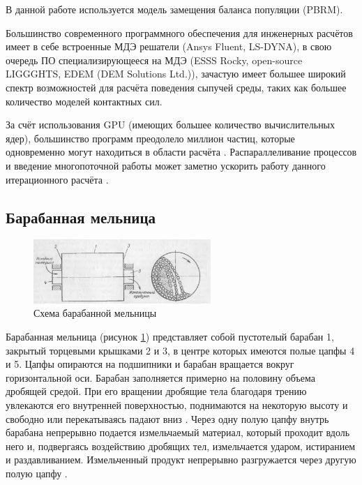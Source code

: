 \documentclass[utf8x, 14pt, oneside, a4paper]{article}
\begin{document}
В данной работе используется модель замещения баланса популяции (PBRM).

Большинство современного программного обеспечения для инженерных расчётов имеет в себе встроенные МДЭ решатели (Ansys Fluent, LS-DYNA), в свою очередь ПО специализирующееся на МДЭ (ESSS Rocky, open-source LIGGGHTS, EDEM (DEM Solutions Ltd.)), зачастую имеет большее широкий спектр возможностей для расчёта поведения сыпучей среды, таких как большее количество моделей контактных сил.

За счёт использования GPU (имеющих большее количество вычислительных ядер), большинство программ преодолело миллион частиц, которые одновременно могут находиться в области расчёта \cite{another_hard}. 
Распараллеливание процессов и введение многопоточной работы может заметно ускорить работу данного итерационного расчёта \cite{priklad}.

\subsection*{Барабанная мельница}
\label{mill_theory}

\begin{figure}[H]
	\centering
	\includegraphics[width=0.6\textwidth]{baraban_shema}
	\caption{Схема барабанной мельницы}
	\label{pic:baraban_shema}
\end{figure} 

Барабанная мельница (рисунок \ref{pic:baraban_shema}) представляет собой пустотелый барабан 1, закрытый торцевыми крышками 2 и 3, в центре которых имеются полые цапфы 4 и 5. 
Цапфы опираются на подшипники и барабан вращается вокруг горизонтальной оси.
Барабан заполняется примерно на половину объема дробящей средой.
При его вращении дробящие тела  благодаря трению увлекаются его внутренней поверхностью, поднимаются на некоторую высоту и свободно или перекатываясь падают вниз \cite{china_mill}.
Через одну полую цапфу внутрь барабана непрерывно подается измельчаемый материал, который проходит вдоль него и, подвергаясь воздействию дробящих тел, измельчается ударом, истиранием и раздавливанием.
Измельченный продукт непрерывно разгружается через другую полую цапфу \cite{mill_book}.
\end{document}
